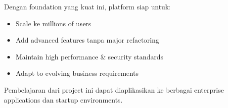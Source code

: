 Dengan foundation yang kuat ini, platform siap untuk:
\begin{itemize}
    \item Scale ke millions of users
    \item Add advanced features tanpa major refactoring
    \item Maintain high performance \& security standards
    \item Adapt to evolving business requirements
\end{itemize}

Pembelajaran dari project ini dapat diaplikasikan ke berbagai enterprise applications dan startup environments.
